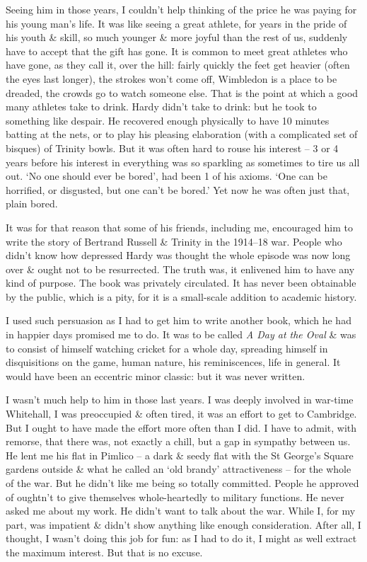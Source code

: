 \documentclass{article}
\numberwithin{equation}{section}
\begin{document}
Seeing him in those years, I couldn't help thinking of the price he was paying for his young man's life. It was like seeing a great athlete, for years in the pride of his youth \& skill, so much younger \& more joyful than the rest of us, suddenly have to accept that the gift has gone. It is common to meet great athletes who have gone, as they call it, over the hill: fairly quickly the feet get heavier (often the eyes last longer), the strokes won't come off, Wimbledon is a place to be dreaded, the crowds go to watch someone else. That is the point at which a good many athletes take to drink. Hardy didn't take to drink: but he took to something like despair. He recovered enough physically to have 10 minutes batting at the nets, or to play his pleasing elaboration (with a complicated set of bisques) of Trinity bowls. But it was often hard to rouse his interest -- 3 or 4 years before his interest in everything was so sparkling as sometimes to tire us all out. `No one should ever be bored', had been 1 of his axioms. `One can be horrified, or disgusted, but one can't be bored.' Yet now he was often just that, plain bored.

It was for that reason that some of his friends, including me, encouraged him to write the story of Bertrand Russell \& Trinity in the 1914--18 war. People who didn't know how depressed Hardy was thought the whole episode was now long over \& ought not to be resurrected. The truth was, it enlivened him to have any kind of purpose. The book was privately circulated. It has never been obtainable by the public, which is a pity, for it is a small-scale addition to academic history.

I used such persuasion as I had to get him to write another book, which he had in happier days promised me to do. It was to be called \textit{A Day at the Oval} \& was to consist of himself watching cricket for a whole day, spreading himself in disquisitions on the game, human nature, his reminiscences, life in general. It would have been an eccentric minor classic: but it was never written.

I wasn't much help to him in those last years. I was deeply involved in war-time Whitehall, I was preoccupied \& often tired, it was an effort to get to Cambridge. But I ought to have made the effort more often than I did. I have to admit, with remorse, that there was, not exactly a chill, but a gap in sympathy between us. He lent me his flat in Pimlico -- a dark \& seedy flat with the St George's Square gardens outside \& what he called an `old brandy' attractiveness -- for the whole of the war. But he didn't like me being so totally committed. People he approved of oughtn't to give themselves whole-heartedly to military functions. He never asked me about my work. He didn't want to talk about the war. While I, for my part, was impatient \& didn't show anything like enough consideration. After all, I thought, I wasn't doing this job for fun: as I had to do it, I might as well extract the maximum interest. But that is no excuse.
\end{document}
